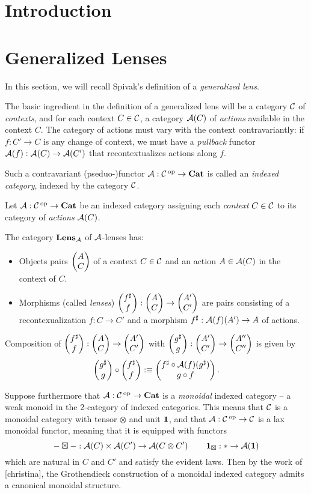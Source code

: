 \section{Introduction}


\section{Generalized Lenses}

In this section, we will recall Spivak's definition of a \emph{generalized lens}.

The basic ingredient in the definition of a generalized lens will be a category
$\Ca$ of \emph{contexts}, and for each context $C \in \Ca$, a category $\Aa(C)$
of \emph{actions} available in the context $C$. The category of actions must
vary with the context contravariantly: if $f : C' \to C$ is any change of
context, we must have a \emph{pullback} functor $\Aa(f) : \Aa(C) \to \Aa(C')$
that recontextualizes actions along $f$.

Such a contravariant (pseduo-)functor $\Aa : \Ca\op \to \Cat$ is called an
\emph{indexed category}, indexed by the category $\Ca$.

\begin{defn}
Let $\Aa : \Ca\op \to \textbf{Cat}$ be an indexed category
assigning each \emph{context} $C \in \Ca$ to its category of \emph{actions}
$\Aa(C)$.

The category $\textbf{Lens}_{\Aa}$ of $\Aa$-lenses has:
\begin{itemize}
\item Objects pairs $\lens{A}{C}$ of a context $C \in \Ca$ and an action $A \in
  \Aa(C)$ in the context of $C$.
\item Morphisms (called \emph{lenses}) $\lens{f^{\sharp}}{f} : \lens{A}{C} \to
  \lens{A'}{C'}$ are pairs consisting of a recontexualization $f : C \to C'$ and
  a morphism $f^{\sharp} : \Aa(f)(A') \to A$ of actions.
\end{itemize}
Composition of $\lens{f^{\sharp}}{f} : \lens{A}{C} \to \lens{A'}{C'}$ with
$\lens{g^{\sharp}}{g} : \lens{A'}{C'} \to \lens{A''}{C''}$ is given by
$$\lens{g^{\sharp}}{g} \circ \lens{f^{\sharp}}{f} :\equiv \lens{f^{\sharp} \circ
\Aa(f)(g^{\sharp})}{g \circ f}.$$
\end{defn}

Suppose furthermore that $\Aa: \Ca\op \to \Cat$ is a \emph{monoidal} indexed
category -- a weak monoid in the 2-category of indexed categories. This means
that $\Ca$ is a monoidal category with tensor $\otimes$ and
unit $\One$, and that $\Aa : \Ca\op \to \Ca$ is a lax monoidal functor, meaning
that it is equipped with functors
$$- \boxtimes - : \Aa(C) \times \Aa(C') \to \Aa(C \otimes C') \quad\quad
\One_{\boxtimes} : \ast \to \Aa(\One)$$
which are natural in $C$ and $C'$ and satisfy the evident laws. Then by the work
of [christina], the Grothendieck construction of a monoidal indexed category
admits a canonical monoidal structure.

